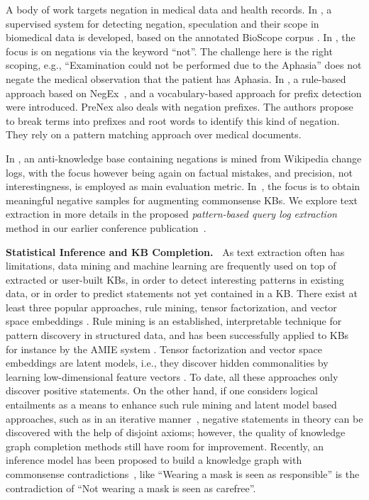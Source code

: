 A body of work targets negation in medical data and health records. In \cite{cruzdiaz}, a supervised system for detecting negation, speculation and their scope in biomedical data is developed, based on the annotated BioScope corpus \cite{bioscope}.
In \cite{Goldin03learningto}, the focus is on negations via the keyword ``not''. The challenge here is the right scoping, e.g., ``Examination could not be performed due to the Aphasia'' does not negate the medical observation that the patient has Aphasia.
In \cite{KEhealth}, a rule-based approach based on NegEx~\cite{CHAPMAN}, and a vocabulary-based approach for prefix detection were introduced.
PreNex \cite{PRENEX} also deals with negation prefixes. The authors propose to break terms into prefixes and root words to identify this kind of negation. They rely on a pattern matching approach over medical documents. 



In \cite{AKB}, an anti-knowledge base containing negations is mined from Wikipedia change logs, with the focus however being again on factual mistakes, and precision, not interestingness, is employed as main evaluation metric. In~\cite{CSKB}, the focus is to obtain meaningful negative samples for augmenting commonsense KBs.
We explore text extraction in more details in the proposed \emph{pattern-based query log extraction} method in our earlier conference publication~\cite{negationakbc}.


\noindent
\textbf{Statistical Inference and KB Completion.\ } As text extraction often has limitations, data mining and machine learning are frequently used on top of extracted or user-built KBs, in order to detect interesting patterns in existing data, or in order to predict statements not yet contained in a KB. There exist at least three popular approaches, rule mining, tensor factorization, and vector space embeddings \cite{KGembsurvey}. Rule mining is an established, interpretable technique for pattern discovery in structured data, and has been successfully applied to KBs for instance by the AMIE system \cite{AMIE3}. Tensor factorization and vector space embeddings are latent models, i.e., they discover hidden commonalities by learning low-dimensional feature vectors \cite{global2014}. To date, all these approaches only discover positive statements. On the other hand, if one considers logical entailments as a means to enhance such rule mining and latent model based approaches, such as in an iterative manner~\cite{WPKD2020}, negative statements in theory can be discovered with the help of disjoint axioms; however, the quality of knowledge graph completion methods still have room for improvement. Recently, an inference model has been proposed to build a knowledge graph with commonsense contradictions~\cite{ANION}, like ``Wearing a mask is seen as responsible'' is the contradiction of ``Not wearing a mask is seen as carefree''.

